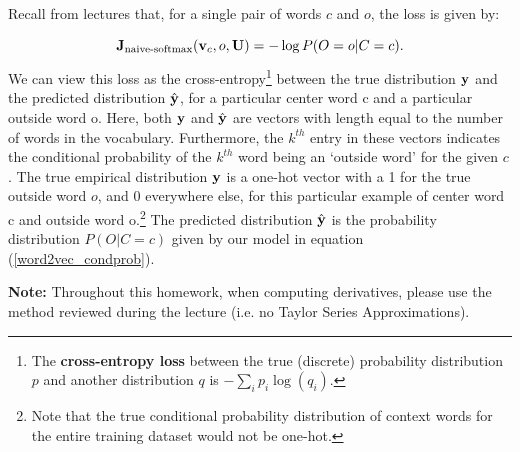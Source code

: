 Recall from lectures that, for a single pair of words $c$ and $o$, the loss is given by:

\begin{equation} 
\mathbf{J}_{\text{naive-softmax}}(\mathbf{v}_c, o, \mathbf{U}) = -\log P(O=o| C=c).
\label{naive-softmax}
\end{equation}
We can view this loss as the cross-entropy\footnote{The \textbf{cross-entropy loss} between the true (discrete) probability distribution $p$ and another distribution $q$ is $-\sum_i p_i \log(q_i)$.} between the true distribution $\mathbf{y}$ and the predicted distribution $\hat{\mathbf{y}}$, for a particular center word c and a particular outside word o. 
Here, both $\mathbf{y}$ and $\hat{\mathbf{y}}$ are vectors with length equal to the number of words in the vocabulary.
Furthermore, the $k^{th}$ entry in these vectors indicates the conditional probability of the $k^{th}$ word being an `outside word' for the given $c$. 
The true empirical distribution $\mathbf{y}$ is a one-hot vector with a 1 for the true outside word $o$, and 0 everywhere else, for this particular example of center word c and outside word o.\footnote{Note that the true conditional probability distribution of context words for the entire training dataset would not be one-hot.}
The predicted distribution $\hat{\mathbf{y}}$ is the probability distribution $P(O|C=c)$ given by our model in equation (\ref{word2vec_condprob}). \newline

\textbf{Note:} Throughout this homework, when computing derivatives, please use the method reviewed during the lecture (i.e. no Taylor Series Approximations).

